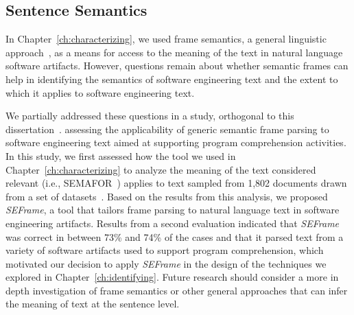 








\subsection{Sentence Semantics}
\label{cp7:semantics}




In Chapter~\ref{ch:characterizing}, we used frame semantics, a general linguistic approach~\cite{fillmore1976frame},
as a means for access to the meaning of the text in natural language software artifacts.
However, questions remain about whether
semantic frames can help in identifying the semantics of software engineering text
and the extent to which it applies to software engineering text.




We partially addressed these questions in a study, 
orthogonal to this dissertation~\cite{marques2021}. 
assessing the applicability of generic semantic frame
parsing to software engineering text
aimed at supporting program
comprehension activities.
In this study, we first assessed how the tool we used in Chapter~\ref{ch:characterizing}
to analyze the meaning of the text considered relevant (i.e., SEMAFOR~\cite{das2014frame})
 applies to text sampled from 1,802 documents drawn from a set of datasets~\cite{Arya2019, Xu2017, Maalej2013, Chaparro2017}. 
Based on the results from this analysis, 
we proposed \textit{SEFrame}, a tool that tailors 
frame parsing to natural language text in software engineering artifacts.
Results from a second evaluation indicated that \textit{SEFrame} was 
 correct in between 73\% and 74\% of
the cases and that it parsed text from a variety of software artifacts used to support program
comprehension, which motivated our decision to apply \textit{SEFrame} 
in the design of the techniques we explored in Chapter~\ref{ch:identifying}.
Future research should consider
a more in depth investigation of 
frame semantics or other general approaches that can infer the meaning of text at the sentence level. 


